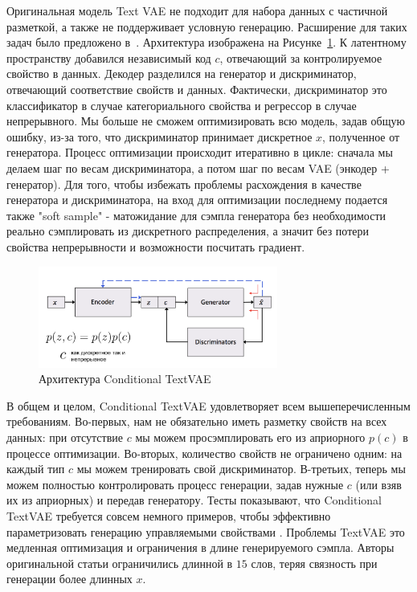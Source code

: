 \documentclass{spbau-diploma}
\begin{document}
Оригинальная модель Text VAE не подходит для набора данных с частичной разметкой, 
а также не поддерживает условную генерацию. Расширение для таких задач было 
предложено в~\cite{text_cvae}. Архитектура изображена на 
Рисунке~\ref{cvae}. К латентному пространству добавился независимый код $c$,
отвечающий за контролируемое свойство в данных. Декодер разделился на генератор 
и дискриминатор, отвечающий соответствие свойств и данных. Фактически, 
дискриминатор это классификатор в случае категориального свойства и регрессор в
случае непрерывного. Мы больше не сможем оптимизировать всю модель, задав общую
ошибку, из-за того, что дискриминатор принимает дискретное $x$, полученное от
генератора. Процесс оптимизации происходит итеративно в цикле: сначала мы 
делаем шаг по весам дискриминатора, а потом шаг по весам VAE (энкодер + 
генератор). Для того, чтобы избежать проблемы расхождения в качестве генератора
и дискриминатора, на вход для оптимизации последнему подается также 
"soft sample" - матожидание для сэмпла генератора без необходимости
реально сэмплировать из дискретного распределения, а значит без потери свойства
непрерывности и возможности посчитать градиент.

\begin{figure}[H]
\centering
\includegraphics[width=0.7\textwidth]{images/cvae.png}
\caption{Архитектура Conditional TextVAE~\cite{text_cvae}}
\label{cvae}
\end{figure}

В общем и целом, Conditional TextVAE удовлетворяет всем вышеперечисленным 
требованиям. Во-первых, нам не обязательно иметь разметку свойств на всех 
данных: при отсутствие $c$ мы можем просэмплировать его из априорного $p(c)$ в
процессе оптимизации. Во-вторых, количество свойств не ограничено одним: на 
каждый тип $c$ мы можем тренировать свой дискриминатор. В-третьих, теперь мы
можем полностью контролировать процесс генерации, задав нужные $c$ (или взяв
их из априорных) и передав генератору. Тесты показывают, что Conditional TextVAE
требуется совсем немного примеров, чтобы эффективно параметризовать генерацию
управляемыми свойствами \cite{text_cvae}. Проблемы TextVAE это медленная
оптимизация и ограничения в длине генерируемого сэмпла. Авторы оригинальной 
статьи ограничились длинной в $15$ слов, теряя связность при генерации более
длинных $x$.
\end{document}
